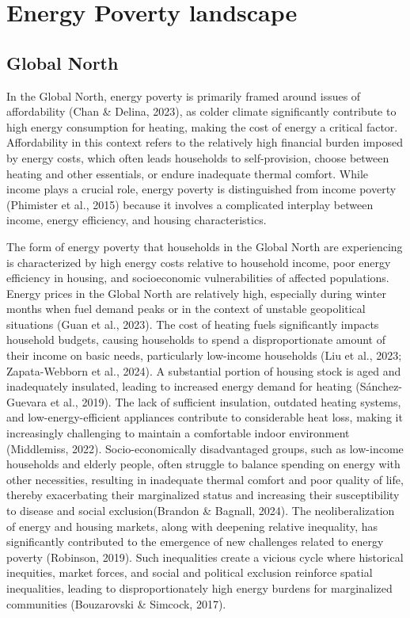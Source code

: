 \documentclass[
  twoside,
  openright,
  degree    = master,               %
  language  = english,              %
  fontset   = overleaf,             %
  watermark = true,                 %
  doi       = true,                 %
]{ntuthesis}
\begin{document}
\hypertarget{energy-poverty-landscape}{%
\section{Energy Poverty landscape}\label{energy-poverty-landscape}}

\hypertarget{global-north}{%
\subsection{Global North}\label{global-north}}

In the Global North, energy poverty is primarily framed around issues of
affordability (Chan \& Delina, 2023), as colder climate significantly
contribute to high energy consumption for heating, making the cost of
energy a critical factor. Affordability in this context refers to the
relatively high financial burden imposed by energy costs, which often
leads households to self-provision, choose between heating and other
essentials, or endure inadequate thermal comfort. While income plays a
crucial role, energy poverty is distinguished from income poverty
(Phimister et al., 2015) because it involves a complicated interplay
between income, energy efficiency, and housing characteristics.

The form of energy poverty that households in the Global North are
experiencing is characterized by high energy costs relative to household
income, poor energy efficiency in housing, and socioeconomic
vulnerabilities of affected populations. Energy prices in the Global
North are relatively high, especially during winter months when fuel
demand peaks or in the context of unstable geopolitical situations (Guan
et al., 2023). The cost of heating fuels significantly impacts household
budgets, causing households to spend a disproportionate amount of their
income on basic needs, particularly low-income households (Liu et al.,
2023; Zapata-Webborn et al., 2024). A substantial portion of housing
stock is aged and inadequately insulated, leading to increased energy
demand for heating (Sánchez-Guevara et al., 2019). The lack of
sufficient insulation, outdated heating systems, and
low-energy-efficient appliances contribute to considerable heat loss,
making it increasingly challenging to maintain a comfortable indoor
environment (Middlemiss, 2022). Socio-economically disadvantaged groups,
such as low-income households and elderly people, often struggle to
balance spending on energy with other necessities, resulting in
inadequate thermal comfort and poor quality of life, thereby
exacerbating their marginalized status and increasing their
susceptibility to disease and social exclusion(Brandon \& Bagnall,
2024). The neoliberalization of energy and housing markets, along with
deepening relative inequality, has significantly contributed to the
emergence of new challenges related to energy poverty (Robinson, 2019).
Such inequalities create a vicious cycle where historical inequities,
market forces, and social and political exclusion reinforce spatial
inequalities, leading to disproportionately high energy burdens for
marginalized communities (Bouzarovski \& Simcock, 2017).
\end{document}
